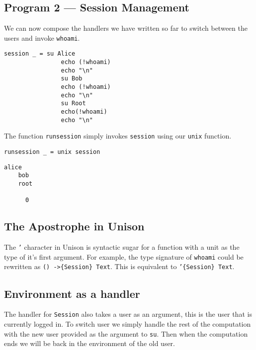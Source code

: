 \documentclass[logo,bsc,singlespacing,parskip]{infthesis}
\begin{document}
\begin{tcolorbox}[colback=gray!10, colframe=black, arc=0pt, outer arc=0pt]
  \section*{Program 2 --- Session Management}
  
  We can now compose the handlers we have written so far to switch between the
  users and invoke \texttt{whoami}.

  \begin{lstlisting}[language=unison]
    session _ = su Alice
                echo (!whoami)
                echo "\n"
                su Bob
                echo (!whoami)
                echo "\n"
                su Root
                echo(!whoami)
                echo "\n"
  \end{lstlisting}

  The function \texttt{runsession} simply invokes \texttt{session} using our
  \texttt{unix} function.

  \begin{lstlisting}[language=unison]
    runsession _ = unix session
  \end{lstlisting}

  \begin{lstlisting}[style=terminal]
    alice
    bob
    root
      
      0
\end{lstlisting}
\end{tcolorbox}

\subsection{The Apostrophe in Unison}

The \texttt{'} character in Unison is syntactic sugar for a function with a
unit as the type of it's first argument. For example, the type signature of 
\texttt{whoami} could be rewritten as \texttt{() ->\{Session\} Text}. This is 
equivalent to \texttt{'\{Session\} Text}.

\subsection{Environment as a handler}

The handler for \texttt{Session} also takes a user as an argument, this is the
user that is currently logged in. To switch user we simply handle the rest of
the computation with the new user provided as the argument to \texttt{su}. Then
when the computation ends we will be back in the environment of the old user.
\end{document}
